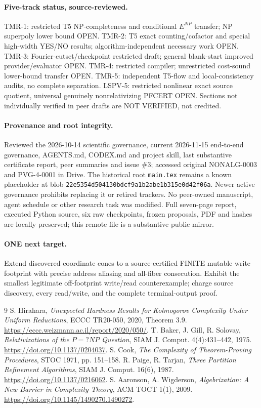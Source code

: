 \documentclass[11pt]{article}
\begin{document}
\paragraph{Five-track status, source-reviewed.} TMR-1: restricted T5 NP-completeness and conditional $E^{NP}$ transfer; NP superpoly lower bound OPEN. TMR-2: T5 exact counting/cofactor and special high-width YES/NO results; algorithm-independent necessary work OPEN. TMR-3: Fourier-cutset/checkpoint restricted draft; general blank-start improved provider/evaluator OPEN. TMR-4: restricted compiler; unrestricted cost-sound lower-bound transfer OPEN. TMR-5: independent T5-flow and local-consistency audits, no complete separation. LSPV-5: restricted nonlinear exact source quotient, universal genuinely nonrelativizing PFCERT OPEN. Sections not individually verified in peer drafts are NOT VERIFIED, not credited.
\paragraph{Provenance and root integrity.} Reviewed the 2026-10-14 scientific governance, current 2026-11-15 end-to-end governance, AGENTS.md, CODEX.md and project skill, last substantive certificate report, peer summaries and issue \#3; accessed original NONALG-0003 and PVG-4-0001 in Drive. The historical root \texttt{main.tex} remains a known placeholder at blob \texttt{22e5354d504130bdcf9a1b2abe1b315e0d42f06a}. Newer active governance prohibits replacing it or retired trackers. No peer-owned manuscript, agent schedule or other research task was modified. Full seven-page report, executed Python source, six raw checkpoints, frozen proposals, PDF and hashes are locally preserved; this remote file is a substantive public mirror.
\paragraph{ONE next target.} Extend discovered coordinate cones to a source-certified FINITE mutable write footprint with precise address aliasing and all-fiber consecution. Exhibit the smallest legitimate off-footprint write/read counterexample; charge source discovery, every read/write, and the complete terminal-output proof.

\begin{thebibliography}{9}
 S. Hirahara, \emph{Unexpected Hardness Results for Kolmogorov Complexity Under Uniform Reductions}, ECCC TR20-050, 2020, Theorem 3.9. \url{https://eccc.weizmann.ac.il/report/2020/050/}.
 T. Baker, J. Gill, R. Solovay, \emph{Relativizations of the $P=?NP$ Question}, SIAM J. Comput. 4(4):431--442, 1975. \url{https://doi.org/10.1137/0204037}.
 S. Cook, \emph{The Complexity of Theorem-Proving Procedures}, STOC 1971, pp. 151--158.
 R. Paige, R. Tarjan, \emph{Three Partition Refinement Algorithms}, SIAM J. Comput. 16(6), 1987. \url{https://doi.org/10.1137/0216062}.
 S. Aaronson, A. Wigderson, \emph{Algebrization: A New Barrier in Complexity Theory}, ACM TOCT 1(1), 2009. \url{https://doi.org/10.1145/1490270.1490272}.
\end{thebibliography}
\end{document}
